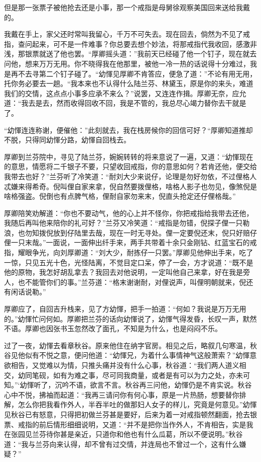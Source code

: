 \documentclass[12pt,UTF8]{ctexbook}
\begin{document}
{{{但是那一张票子被他抢去还是小事，那一个戒指是母舅徐观察美国回来送给我戴的。

我戴在手上，家父还时常叫我留心，千万不可失去。现在回去，倘然为不见了戒指，查问起来，可不是一件难事？你总要去想个妙法，将那戒指代我收回，感激非浅，那银票就送了他也罢。“厚卿摇头道：”我前天已经碰了他一个钉子，现在就去问他，想来万万无用。你不晓得我在他那里，被他一冷一热的话说得十分难过，我是再不去寻第二个钉子碰了。“幼惲见厚卿不肯答应，便急了道：”不论有用无用，托你务必要去一趟。“我本来也不认得什么陆兰芬、林黛玉，原是你的来头，难道我们的交情，这点点小事多应承不来么？”说罢，又连连作揖。厚卿无奈，应允道：“我去是去，然而收得回收不回，我是不管的，我总尽心竭力替你去干就是了。

“幼惲连连称谢，便催他：”此刻就去，我在栈房候你的回信可好？“厚卿知道推却不脱，只得同幼惲分路，幼惲自回栈去。

厚卿到兰芬院中，寻见了陆兰芬，婉婉转转的将来意说了一遍，又道：“幼惲现在的意思，情愿将二千银子不要，只望收回戒指，你的意思如何？若肯还他，便交给我带去也好？”兰芬听了冷笑道：“耐刘大少来说仔，论理是勿好勿依，不过俚格人忒嫌来得希奇。倪叫俚自家来拿，倪自然要拨俚格，啥格人影子也勿见，像煞倪是啥格强盗。倪倒也有点脾气格，俚耐自家勿来末，倪直头抢定还仔俚格哉。”

厚卿陪笑劝解道：“你也不要动气，他的心上并不怪你，你把戒指给我带去还他，我随后再叫他来陪你的礼可好？”兰芬又冷笑道：“戒指是勿错，倪探子俚一只勒浪，也勿知拨倪放到仔陆里去哉，现在一时无寻处。俚一定要倪还末，倪只好赔仔俚一只末哉。”一面说，一面伸出纤手来，两手共带着十余只金刚钻、红蓝宝石的戒指，耀眼争光，向刘厚卿道：“刘大少，耐拣仔一只罢。”厚卿见他伸出手来，吃了一惊，只见五光十色，光怪陆离，不觉目定口呆，停了一会，方才说道：“既不是他的原物，我怎好胡乱拿去？我回去对他说明，一定叫他自己来拿，好在我是旁人，也不能管你们的事。”兰芬道：“格末谢谢耐，对俚说声，叫俚明朝就来，倪还有闲话说勒。”

厚卿应了，自回吉升栈来，见了方幼惲，把手一拍道：“何如？我说是万万无用的。”幼惲忙问何如。厚卿把兰芬的话向幼惲说了，幼惲气得发昏，长叹一声，默然不语。厚卿也因张书玉忽然改了面孔，不知是为什么，也是闷闷不乐。

过了一夜，幼惲去看章秋谷。原来他住在纳字官房。相见之后，略叙几句寒温，秋谷见他似有不悦之意，便问他道：“幼惲兄，为着什么事情神气这般萧索？”幼惲意欲相告，又觉难以为情，只推头痛并没有什么心事，秋谷道：“我们两人道义相交，幼同笔砚，如有为难之事，尽可同我商量，或者是有可以为力之处，亦未可知。”‘幼惲听了，沉吟不语，欲言不言。秋谷再三问他，幼惲仍是不肯实说。秋谷心中不悦，拂袖而起道：“我再三请问你有何心事，原是一片热肠，想要替你排解，怎么你把我看作外人，半吞半吐的做那妇人女子的样儿，究竟是何意见。”幼惲见秋谷已有怒意，只得把初做兰芬甚是要好，后来为着一对戒指顿然翻面，抢去银票、戒指的前后情形细细说明，又道：“并不是把你当作外人，不肯相告，实是我在张园见兰芬待你甚是亲近，只道你和他也有什么瓜葛，所以不便说明。”秋谷道：“我与兰芬向来认得，却不曾有过交情，并连局也不曾过一个，这有什么嫌疑？”

}}}
\end{document}
